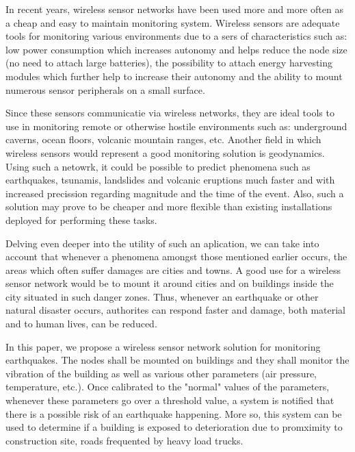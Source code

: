 In recent years, wireless sensor networks have been used more and more often as a cheap and easy to maintain monitoring system.
Wireless sensors are adequate tools for monitoring various environments due to a sers of characteristics such as: low power 
consumption which increases autonomy and helps reduce the node size (no need to attach large batteries), the possibility to 
attach energy harvesting modules which further help to increase their autonomy and the ability to mount numerous sensor peripherals 
on a small surface.

Since these sensors communicatie via wireless networks, they are ideal tools to use in monitoring remote or otherwise hostile 
environments such as: underground caverns, ocean floors, volcanic mountain ranges, etc. Another field in which wireless sensors 
would represent a good monitoring solution is geodynamics. Using such a netowrk, it could be possible to predict phenomena such 
as earthquakes, tsunamis, landslides and volcanic eruptions much faster and with increased precission regarding magnitude and the 
time of the event. Also, such a solution may prove to be cheaper and more flexible than existing installations deployed for performing 
these tasks.

Delving even deeper into the utility of such an aplication, we can take into account that whenever a phenomena amongst those mentioned 
earlier occurs, the areas which often suffer damages are cities and towns. A good use for a wireless sensor network would be to mount it 
around cities and on buildings inside the city situated in such danger zones. Thus, whenever an earthquake or other natural disaster occurs, 
authorites can respond faster and damage, both material and to human lives, can be reduced.

In this paper, we propose a wireless sensor network solution for monitoring earthquakes. The nodes shall be mounted on buildings and 
they shall monitor the vibration of the building as well as various other parameters (air pressure, temperature, etc.). Once calibrated 
to the "normal" values of the parameters, whenever these parameters go over a threshold value, a system is notified that there is a possible 
risk of an earthquake happening. More so, this system can be used to determine if a building is exposed to deterioration due to promximity 
to construction site, roads frequented by heavy load trucks.
